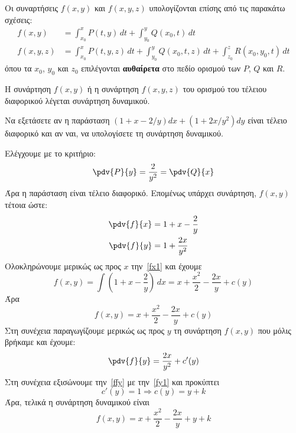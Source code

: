\documentclass[a4paper,table]{report}
\begin{document}
\begin{rem}\label{olokl}
  Οι συναρτήσεις  $ f(x,y) $  και  $ f(x,y,z) $ υπολογίζονται επίσης από τις 
  παρακάτω σχέσεις:
  \begin{align*}
    f(x,y) &= \int_{x_{0}}^{x} P(t,y) \,{dt} + \int_{y_{0}}^{y} Q(x_{0},t) \,{dt} \\
    f(x,y,z) &= \int_{x_{0}}^{x} P(t,y,z) \,{dt} + \int_{y_{0}}^{y} Q(x_{0},t,z) 
    \,{dt} + \int _{z_{0}}^{z} R(x_{0},y_{0},t) \,{dt}  
  \end{align*}
  όπου τα $ x_{0} $, $ y_{0} $  και  $ z_{0} $ επιλέγονται \textbf{αυθαίρετα} στο πεδίο 
  ορισμού των  $ P $, $ Q $  και  $ R $.
\end{rem}

\begin{rem}
  Η συνάρτηση $ f(x,y) $ ή η συνάρτηση $ f(x,y,z) $ του ορισμού του τέλειου διαφορικού
  λέγεται \textcolor{Col2}{συνάρτηση δυναμικού}.
\end{rem}

\begin{example}
  Να εξετάσετε αν η παράσταση $ \left(1+x- {2}/{y}\right)dx + 
  \left(1+ {2x}/{y^{2}} \right)dy $ είναι τέλειο διαφορικό και αν ναι, να 
  υπολογίσετε τη συνάρτηση δυναμικού.
\end{example}
\begin{solution}
  Ελέγχουμε με το κριτήριο:
  \[ 
    \pdv{P}{y} = \frac{2}{y^{2}} = \pdv{Q}{x} 
  \]
  Άρα η παράσταση είναι τέλειο διαφορικό. Επομένως υπάρχει 
  συνάρτηση, $ f(x,y) $ τέτοια ώστε: 
  \begin{align}
    \pdv{f}{x} &= 1 + x - \frac{2}{y} \label{fx1} \\
    \pdv{f}{y} &= 1+ \frac{2x}{y^{2}} \label{fy1}
  \end{align}
  Ολοκληρώνουμε μερικώς ως προς $x$ την~\eqref{fx1} και έχουμε
  \[
    f(x,y) = \int \left(1+x- \frac{2}{y}\right) \,{dx} = x + 
    \frac{x^{2}}{2} - \frac{2x}{y} + c(y) 
  \] 
  Άρα  
  \begin{equation}
    f(x,y) = x + \frac{x^{2}}{2} - \frac{2x}{y} + c(y) \label{fxy}
  \end{equation}
  Στη συνέχεια παραγωγίζουμε μερικώς ως προς $y$ τη συνάρτηση $ f(x,y) $ που μόλις 
  βρήκαμε και έχουμε:
  \begin{equation}
    \pdv{f}{y} = \frac{2x}{y^{2}} + c'(y) \label{ffy}
  \end{equation} 
  Στη συνέχεια εξισώνουμε την~\eqref{ffy} με την~\eqref{fy1} και προκύπτει
  \[
    c'(y) = 1 \Rightarrow c(y) = y + k 
  \] 
  Άρα, τελικά η συνάρτηση δυναμικού είναι 
  \[
    f(x,y) = x + \frac{x^{2}}{2} - \frac{2x}{y} + y + k 
  \] 
\end{solution}
\end{document}
